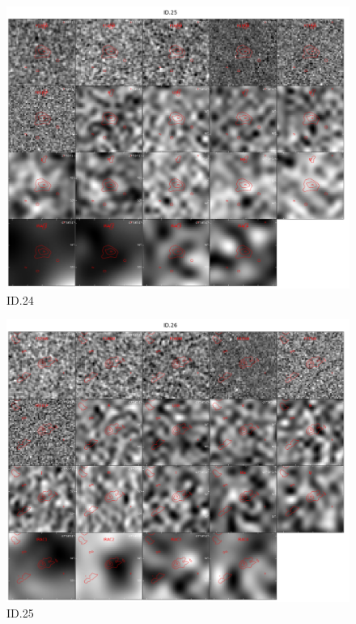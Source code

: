 \begin{figure}[tbp]
\centering \includegraphics[width=120mm]{Matched/ASPECS_Cutout_24.jpg}
\caption{ID.24}
\label{fig:Match_Three}
\end{figure}

\begin{figure}[tbp]
\centering \includegraphics[width=120mm]{Matched/ASPECS_Cutout_25.jpg}
\caption{ID.25}
\label{fig:Match_Three}
\end{figure}

